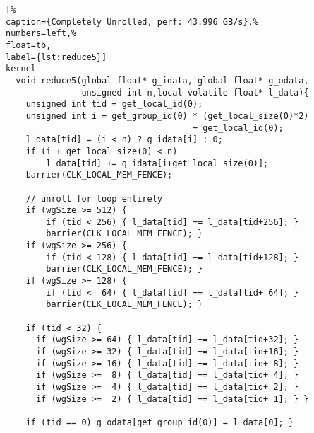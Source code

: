 \begin{lstlisting}[%                                                             
caption={Completely Unrolled, perf: 43.996 GB/s},%
numbers=left,%
float=tb,
label={lst:reduce5}]
kernel
  void reduce5(global float* g_idata, global float* g_odata,
               unsigned int n,local volatile float* l_data){
    unsigned int tid = get_local_id(0);
    unsigned int i = get_group_id(0) * (get_local_size(0)*2)
                                     + get_local_id(0);
    l_data[tid] = (i < n) ? g_idata[i] : 0;
    if (i + get_local_size(0) < n) 
        l_data[tid] += g_idata[i+get_local_size(0)];  
    barrier(CLK_LOCAL_MEM_FENCE);

    // unroll for loop entirely
    if (wgSize >= 512) {
        if (tid < 256) { l_data[tid] += l_data[tid+256]; }
        barrier(CLK_LOCAL_MEM_FENCE); }
    if (wgSize >= 256) {
        if (tid < 128) { l_data[tid] += l_data[tid+128]; }
        barrier(CLK_LOCAL_MEM_FENCE); }
    if (wgSize >= 128) {
        if (tid <  64) { l_data[tid] += l_data[tid+ 64]; }
        barrier(CLK_LOCAL_MEM_FENCE); }
    
    if (tid < 32) {
      if (wgSize >= 64) { l_data[tid] += l_data[tid+32]; }
      if (wgSize >= 32) { l_data[tid] += l_data[tid+16]; }
      if (wgSize >= 16) { l_data[tid] += l_data[tid+ 8]; }
      if (wgSize >=  8) { l_data[tid] += l_data[tid+ 4]; }
      if (wgSize >=  4) { l_data[tid] += l_data[tid+ 2]; }
      if (wgSize >=  2) { l_data[tid] += l_data[tid+ 1]; } }
    
    if (tid == 0) g_odata[get_group_id(0)] = l_data[0]; }
\end{lstlisting}

